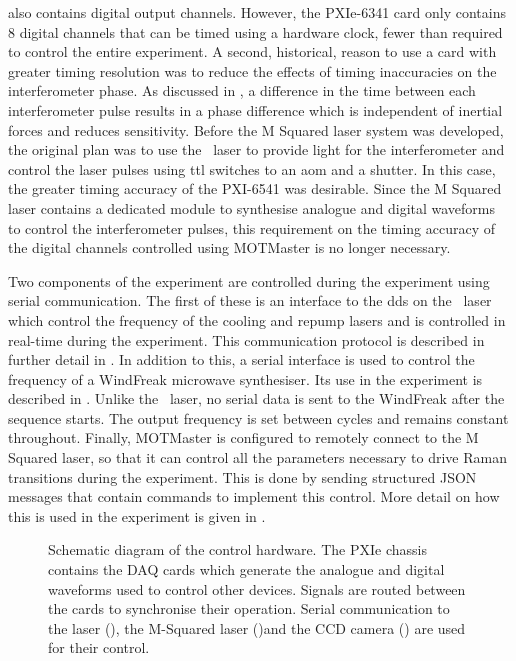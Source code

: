 also contains digital output channels. However, the PXIe-6341 card only
contains 8 digital channels that can be timed using a hardware clock, fewer
than required to control the entire experiment. A second, historical, reason
to use a card with greater timing resolution was to reduce the effects of
timing inaccuracies on the interferometer phase. As discussed in
, a difference in the time between each
interferometer pulse results in a phase difference which is independent of
inertial forces and reduces sensitivity. Before the M Squared laser system
was developed, the original plan was to use the \Muquans\ laser to provide
light for the interferometer and control the laser pulses using \ac{ttl}
switches to an \ac{aom} and a shutter. In this case, the greater timing
accuracy of the PXI-6541 was desirable. Since the M Squared laser contains a
dedicated module to synthesise analogue and digital waveforms to control the
interferometer pulses, this requirement on the timing accuracy of the digital
channels controlled using MOTMaster is no longer necessary. \par\noindent
Two components of the experiment are controlled during the experiment using
serial communication. The first of these is an interface to the \ac{dds} on
the \Muquans\ laser which control the frequency of the cooling and repump
lasers and is controlled in real-time during the experiment. This
communication protocol is described in further detail in
. In addition to this, a serial interface is
used to control the frequency of a WindFreak microwave synthesiser. Its use
in the experiment is described in . Unlike the
\Muquans\ laser, no serial data is sent to the WindFreak after the sequence
starts. The output frequency is set between cycles and remains constant
throughout. Finally, MOTMaster is configured to remotely connect to the M
Squared laser, so that it can control all the parameters necessary to drive
Raman transitions during the experiment. This is done by sending structured
JSON messages that contain commands to implement this control. More detail on how this is used in the experiment is given in
.
\begin{figure}
    \centering
    \fontsize{16pt}{14pt}
    \resizebox{1\textwidth}{!}{}
    \caption[Control hardware schematic diagram]{Schematic diagram of the control hardware. The PXIe chassis contains the DAQ cards which generate the analogue and digital waveforms used to control other devices. Signals are routed between the cards to synchronise their operation. Serial communication to the \Muquans laser (), the M-Squared laser ()and the CCD camera () are used for their control.}
    \label{fig:control_hardware}
\end{figure}
